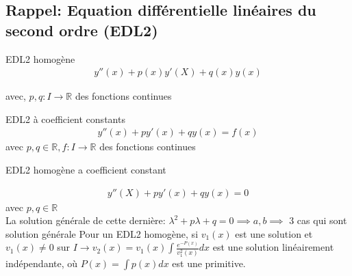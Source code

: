 


\subsection{Rappel: Equation différentielle linéaires du second ordre (EDL2)}
\begin{parag}{EDL2 homogène}
    \begin{align*}
        y''(x) + p(x)y'(X) + q(x) y(x)
    \end{align*}
    
    avec, $p, q : I \to \mathbb{R}$ des fonctions continues

\end{parag}
\begin{parag}{EDL2 à coefficient constants}
    \begin{align*}
        y''(x) + py'(x) + qy(x) = f(x)
    \end{align*}
    avec $p, q \in \mathbb{R}, f: I \to \mathbb{R}$ des fonctions continues    

\end{parag}

\begin{parag}{EDL2 homogène a coefficient constant}

    \begin{align*}
        y''(X) + py'(x) + qy(x) = 0
    \end{align*}
    avec $p, q \in \mathbb{R}$
    \\
    La solution générale de cette dernière: $ \lambda^2 + p \lambda + q = 0 \implies a, b \implies$ 3 cas qui sont solution générale Pour un EDL2 homogène, si $v_1(x)$ est une solution et $v_1(x) \neq 0$ sur $I \to v_2(x) = v_1(x) \int \frac{e^{-P(x)}}{v_1^2(x)} dx$ est une solution linéairement indépendante, où $P(x) = \int p(x)dx$ est une primitive.

\end{parag}

